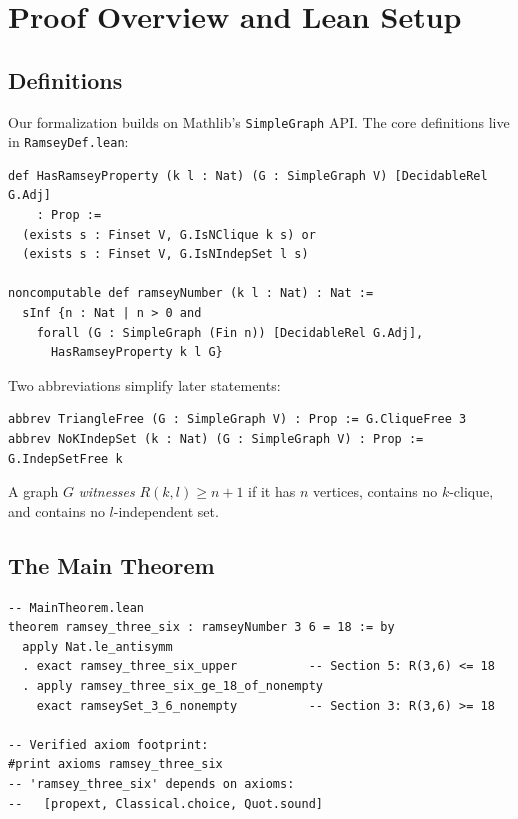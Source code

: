 \documentclass[11pt]{article}
\newcommand{\lean}[1]{\texttt{#1}}
\begin{document}
\section{Proof Overview and Lean Setup}
\label{sec:overview}

\subsection{Definitions}

Our formalization builds on Mathlib's \lean{SimpleGraph} API.
The core definitions live in \texttt{RamseyDef.lean}:

\begin{lstlisting}
def HasRamseyProperty (k l : Nat) (G : SimpleGraph V) [DecidableRel G.Adj]
    : Prop :=
  (exists s : Finset V, G.IsNClique k s) or
  (exists s : Finset V, G.IsNIndepSet l s)

noncomputable def ramseyNumber (k l : Nat) : Nat :=
  sInf {n : Nat | n > 0 and
    forall (G : SimpleGraph (Fin n)) [DecidableRel G.Adj],
      HasRamseyProperty k l G}
\end{lstlisting}

\noindent
Two abbreviations simplify later statements:

\begin{lstlisting}
abbrev TriangleFree (G : SimpleGraph V) : Prop := G.CliqueFree 3
abbrev NoKIndepSet (k : Nat) (G : SimpleGraph V) : Prop := G.IndepSetFree k
\end{lstlisting}

\noindent
A graph $G$ \emph{witnesses} $R(k,l) \geq n+1$ if it has $n$ vertices,
contains no $k$-clique, and contains no $l$-independent set.

\subsection{The Main Theorem}

\begin{lstlisting}
-- MainTheorem.lean
theorem ramsey_three_six : ramseyNumber 3 6 = 18 := by
  apply Nat.le_antisymm
  . exact ramsey_three_six_upper          -- Section 5: R(3,6) <= 18
  . apply ramsey_three_six_ge_18_of_nonempty
    exact ramseySet_3_6_nonempty          -- Section 3: R(3,6) >= 18

-- Verified axiom footprint:
#print axioms ramsey_three_six
-- 'ramsey_three_six' depends on axioms:
--   [propext, Classical.choice, Quot.sound]
\end{lstlisting}
\end{document}
